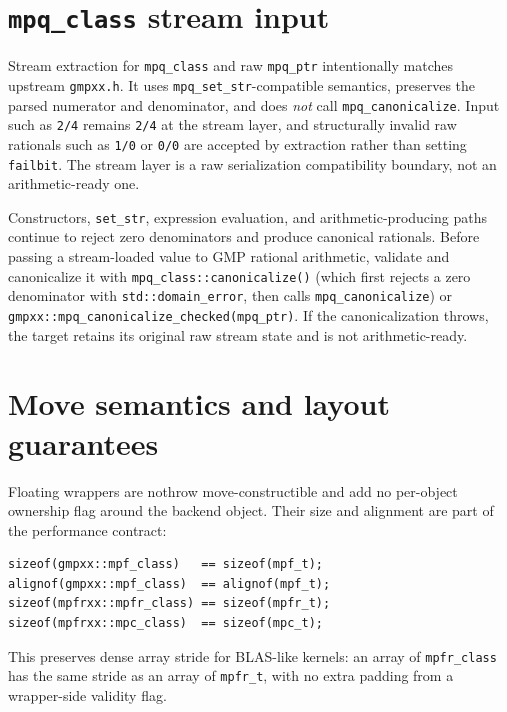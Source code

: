 \documentclass[11pt,a4paper]{article}
\newcommand{\code}[1]{\lstinline!#1!}
\begin{document}
\section{\code{mpq_class} stream input}\label{sec:mpqstream}

Stream extraction for \code{mpq_class} and raw \code{mpq_ptr} intentionally
matches upstream \code{gmpxx.h}. It uses \code{mpq_set_str}-compatible semantics,
preserves the parsed numerator and denominator, and does \emph{not} call
\code{mpq_canonicalize}. Input such as \code{2/4} remains \code{2/4} at the stream
layer, and structurally invalid raw rationals such as \code{1/0} or \code{0/0}
are accepted by extraction rather than setting \code{failbit}. The stream layer
is a raw serialization compatibility boundary, not an arithmetic-ready one.

Constructors, \code{set_str}, expression evaluation, and arithmetic-producing
paths continue to reject zero denominators and produce canonical rationals.
Before passing a stream-loaded value to GMP rational arithmetic, validate and
canonicalize it with \code{mpq_class::canonicalize()} (which first rejects a zero
denominator with \code{std::domain_error}, then calls \code{mpq_canonicalize}) or
\code{gmpxx::mpq_canonicalize_checked(mpq_ptr)}. If the canonicalization throws,
the target retains its original raw stream state and is not arithmetic-ready.

\section{Move semantics and layout guarantees}

Floating wrappers are nothrow move-constructible and add no per-object ownership
flag around the backend object. Their size and alignment are part of the
performance contract:

\begin{lstlisting}
sizeof(gmpxx::mpf_class)   == sizeof(mpf_t);
alignof(gmpxx::mpf_class)  == alignof(mpf_t);
sizeof(mpfrxx::mpfr_class) == sizeof(mpfr_t);
sizeof(mpfrxx::mpc_class)  == sizeof(mpc_t);
\end{lstlisting}

This preserves dense array stride for BLAS-like kernels: an array of
\code{mpfr_class} has the same stride as an array of \code{mpfr_t}, with no extra
padding from a wrapper-side validity flag.
\end{document}
